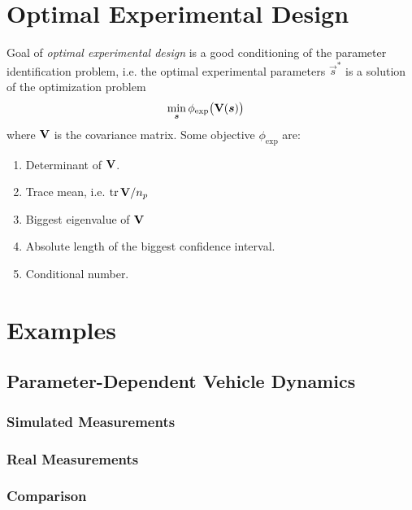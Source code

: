 	\section{Optimal Experimental Design}
		Goal of \emph{optimal experimental design} is a good conditioning of the parameter identification problem, i.e. the optimal experimental parameters \( \vec{s}^\ast \) is a solution of the optimization problem
		\begin{align*}
			\min_{\bm{s}} & \, \phi_\mathrm{exp}\big(\bm{\mathrm{V}}(\bm{s})\big)
		\end{align*}
		where \(\bm{\mathrm{V}}\) is the covariance matrix. Some objective \(\phi_\mathrm{exp}\) are:
		\begin{enumerate}
			\item Determinant of \(\bm{\mathrm{V}}\).
			\item Trace mean, i.e. \( \tr \bm{\mathrm{V}} / n_p \)
			\item Biggest eigenvalue of \(\bm{\mathrm{V}}\)
			\item Absolute length of the biggest confidence interval.
			\item Conditional number.
		\end{enumerate}

	\section{Examples} %

		\subsection{Parameter-Dependent Vehicle Dynamics} %

			\subsubsection{Simulated Measurements} %

			\subsubsection{Real Measurements} %

			\subsubsection{Comparison} %

